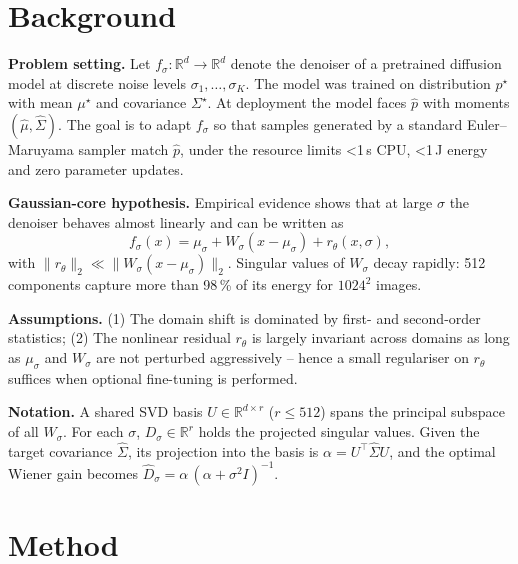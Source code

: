 \documentclass{article} %
\begin{document}
\section{Background}
\label{sec:background}
\textbf{Problem setting.} Let $f_{\sigma}:\mathbb R^{d}\!\to\!\mathbb R^{d}$ denote the denoiser of a pretrained diffusion model at discrete noise levels $\sigma_{1},\dots,\sigma_{K}$. The model was trained on distribution $p^{\star}$ with mean $\mu^{\star}$ and covariance $\Sigma^{\star}$. At deployment the model faces $\hat p$ with moments $(\hat{\mu},\hat\Sigma)$. The goal is to adapt $f_{\sigma}$ so that samples generated by a standard Euler--Maruyama sampler match $\hat p$, under the resource limits \textless{}1\,s CPU, \textless{}1\,J energy and zero parameter updates.

\textbf{Gaussian-core hypothesis.} Empirical evidence shows that at large $\sigma$ the denoiser behaves almost linearly and can be written as
\[
f_{\sigma}(x)=\mu_{\sigma}+W_{\sigma}(x-\mu_{\sigma})+r_{\theta}(x,\sigma),
\]
with $\lVert r_{\theta}\rVert_{2}\ll\lVert W_{\sigma}(x-\mu_{\sigma})\rVert_{2}$. Singular values of $W_{\sigma}$ decay rapidly: 512 components capture more than 98\,\% of its energy for $1024^{2}$ images.

\textbf{Assumptions.} (1) The domain shift is dominated by first- and second-order statistics; (2) The nonlinear residual $r_{\theta}$ is largely invariant across domains as long as $\mu_{\sigma}$ and $W_{\sigma}$ are not perturbed aggressively – hence a small regulariser on $r_{\theta}$ suffices when optional fine-tuning is performed.

\textbf{Notation.} A shared SVD basis $U\in\mathbb R^{d\times r}$ ($r\le512$) spans the principal subspace of all $W_{\sigma}$. For each $\sigma$, $D_{\sigma}\in\mathbb R^{r}$ holds the projected singular values. Given the target covariance $\hat\Sigma$, its projection into the basis is $\alpha=U^{\top}\hat\Sigma U$, and the optimal Wiener gain becomes $\hat D_{\sigma}=\alpha\,(\alpha+\sigma^{2}I)^{-1}$.

\section{Method}
\label{sec:method}
\end{document}
